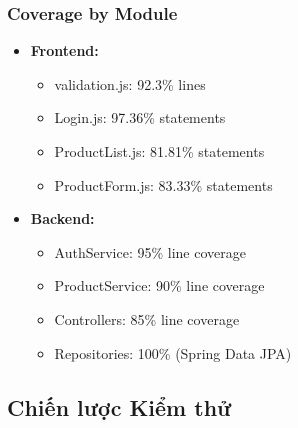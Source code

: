 \subsubsection{Coverage by Module}
\begin{itemize}
    \item \textbf{Frontend:}
    \begin{itemize}
        \item validation.js: 92.3\% lines
        \item Login.js: 97.36\% statements
        \item ProductList.js: 81.81\% statements
        \item ProductForm.js: 83.33\% statements
    \end{itemize}
    \item \textbf{Backend:}
    \begin{itemize}
        \item AuthService: 95\% line coverage
        \item ProductService: 90\% line coverage
        \item Controllers: 85\% line coverage
        \item Repositories: 100\% (Spring Data JPA)
    \end{itemize}
\end{itemize}

\subsection{Chiến lược Kiểm thử}

